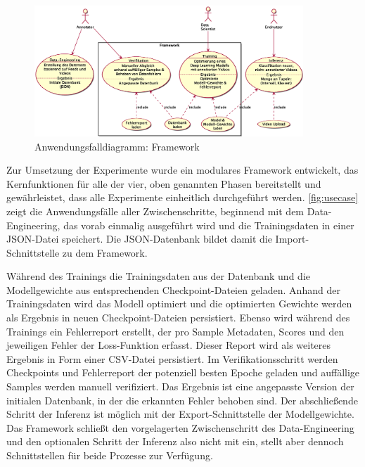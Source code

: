 \begin{figure}[htbp!]
    \centering
    \includegraphics[width=0.9\textwidth, height=0.8\textwidth, keepaspectratio, interpolate]{fig/usecase.eps}
    \caption{Anwendungsfalldiagramm: Framework}
    \label{fig:usecase}
\end{figure}

Zur Umsetzung der Experimente wurde ein modulares Framework entwickelt, das Kernfunktionen für alle der vier, oben genannten Phasen bereitstellt und gewährleistet, dass alle Experimente einheitlich durchgeführt werden.
\autoref{fig:usecase} zeigt die Anwendungsfälle aller Zwischenschritte, beginnend mit dem Data-Engineering, das vorab einmalig ausgeführt wird und die Trainingsdaten in einer JSON-Datei speichert.
Die JSON-Datenbank bildet damit die Import-Schnittstelle zu dem Framework.

Während des Trainings die Trainingsdaten aus der Datenbank und die Modellgewichte aus entsprechenden Checkpoint-Dateien geladen.
Anhand der Trainingsdaten wird das Modell optimiert und die optimierten Gewichte werden als Ergebnis in neuen Checkpoint-Dateien persistiert.
Ebenso wird während des Trainings ein Fehlerreport erstellt, der pro Sample Metadaten, Scores und den jeweiligen Fehler der Loss-Funktion erfasst.
Dieser Report wird als weiteres Ergebnis in Form einer CSV-Datei persistiert.
Im Verifikationsschritt werden Checkpoints und Fehlerreport der potenziell besten Epoche geladen und auffällige Samples werden manuell verifiziert.
Das Ergebnis ist eine angepasste Version der initialen Datenbank, in der die erkannten Fehler behoben sind.
Der abschließende Schritt der Inferenz ist möglich mit der Export-Schnittstelle der Modellgewichte.
Das Framework schließt den vorgelagerten Zwischenschritt des Data-Engineering und den optionalen Schritt der Inferenz also nicht mit ein, stellt aber dennoch Schnittstellen für beide Prozesse zur Verfügung.

